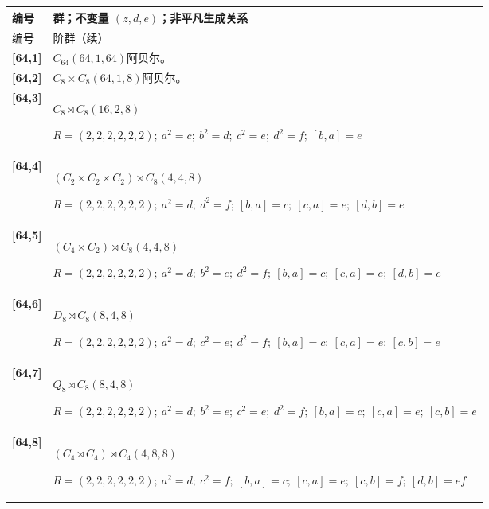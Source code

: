 \documentclass[UTF8,fontset=fandol,11pt,a4paper]{ctexart}
\begin{document}
\begin{longtable}{@{}p{17mm}>{\raggedright\arraybackslash}p{141mm}@{}}

\toprule 编号 & 群；不变量 $(z,d,e)$；非平凡生成关系\\\midrule\endfirsthead

\toprule 编号 & 64 阶群（续）\\\midrule\endhead\bottomrule\endfoot

\textbf{[64,1]} & $C_{64}$\quad $(64,1,64)$\quad 阿贝尔。\\[3pt]

\textbf{[64,2]} & $C_{8}\times C_{8}$\quad $(64,1,8)$\quad 阿贝尔。\\[3pt]

\textbf{[64,3]} & $C_{8}\rtimes C_{8}$\quad $(16,2,8)$\par\(R=(2,2,2,2,2,2);\allowbreak\ a^{2}=c;\allowbreak\ b^{2}=d;\allowbreak\ c^{2}=e;\allowbreak\ d^{2}=f;\allowbreak\ [b,a]=e\)\\[3pt]

\textbf{[64,4]} & $(C_{2}\times C_{2}\times C_{2})\rtimes C_{8}$\quad $(4,4,8)$\par\(R=(2,2,2,2,2,2);\allowbreak\ a^{2}=d;\allowbreak\ d^{2}=f;\allowbreak\ [b,a]=c;\allowbreak\ [c,a]=e;\allowbreak\ [d,b]=e\)\\[3pt]

\textbf{[64,5]} & $(C_{4}\times C_{2})\rtimes C_{8}$\quad $(4,4,8)$\par\(R=(2,2,2,2,2,2);\allowbreak\ a^{2}=d;\allowbreak\ b^{2}=e;\allowbreak\ d^{2}=f;\allowbreak\ [b,a]=c;\allowbreak\ [c,a]=e;\allowbreak\ [d,b]=e\)\\[3pt]

\textbf{[64,6]} & $D_{8}\rtimes C_{8}$\quad $(8,4,8)$\par\(R=(2,2,2,2,2,2);\allowbreak\ a^{2}=d;\allowbreak\ c^{2}=e;\allowbreak\ d^{2}=f;\allowbreak\ [b,a]=c;\allowbreak\ [c,a]=e;\allowbreak\ [c,b]=e\)\\[3pt]

\textbf{[64,7]} & $Q_{8}\rtimes C_{8}$\quad $(8,4,8)$\par\(R=(2,2,2,2,2,2);\allowbreak\ a^{2}=d;\allowbreak\ b^{2}=e;\allowbreak\ c^{2}=e;\allowbreak\ d^{2}=f;\allowbreak\ [b,a]=c;\allowbreak\ [c,a]=e;\allowbreak\ [c,b]=e\)\\[3pt]

\textbf{[64,8]} & $(C_{4}\rtimes C_{4})\rtimes C_{4}$\quad $(4,8,8)$\par\(R=(2,2,2,2,2,2);\allowbreak\ a^{2}=d;\allowbreak\ c^{2}=f;\allowbreak\ [b,a]=c;\allowbreak\ [c,a]=e;\allowbreak\ [c,b]=f;\allowbreak\ [d,b]=ef\)\\[3pt]


\end{longtable}
\end{document}
